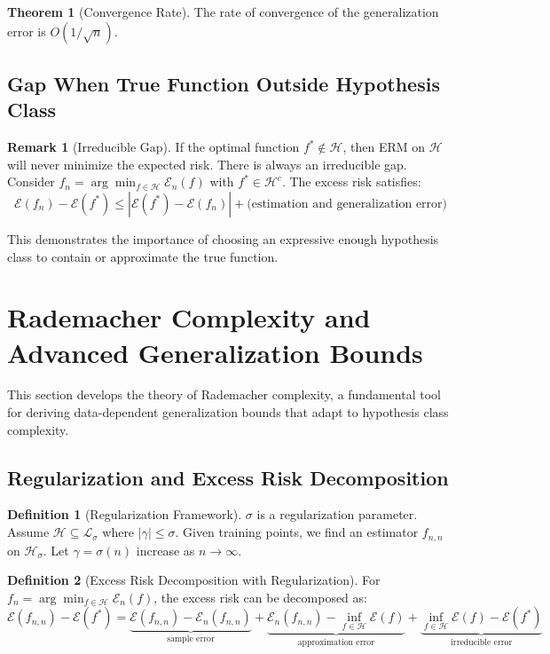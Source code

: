 \documentclass[12pt,a4paper]{article}
\theoremstyle{definition}
\newtheorem{definition}{Definition}[section]
\newtheorem{theorem}{Theorem}[section]
\newtheorem{remark}{Remark}[section]
\begin{document}
\begin{theorem}[Convergence Rate]
The rate of convergence of the generalization error is $O(1/\sqrt{n})$.
\end{theorem}

\subsection{Gap When True Function Outside Hypothesis Class}

\begin{remark}[Irreducible Gap]
If the optimal function $f^* \notin \mathcal{H}$, then ERM on $\mathcal{H}$ will never minimize the expected risk. There is always an irreducible gap. Consider $f_n = \arg\min_{f \in \mathcal{H}} \mathcal{E}_n(f)$ with $f^* \in \mathcal{H}^c$. The excess risk satisfies:
\[
\mathcal{E}(f_n) - \mathcal{E}(f^*) \leq |\mathcal{E}(f^*) - \mathcal{E}(f_n)| + \text{(estimation and generalization error)}
\]

This demonstrates the importance of choosing an expressive enough hypothesis class to contain or approximate the true function.
\end{remark}

\newpage


\section{Rademacher Complexity and Advanced Generalization Bounds}

This section develops the theory of Rademacher complexity, a fundamental tool for deriving data-dependent generalization bounds that adapt to hypothesis class complexity.

\subsection{Regularization and Excess Risk Decomposition}

\begin{definition}[Regularization Framework]
$\sigma$ is a regularization parameter. Assume $\mathcal{H} \subseteq \mathcal{L}_\sigma$ where $|\gamma| \leq \sigma$. Given training points, we find an estimator $f_{n,n}$ on $\mathcal{H}_\sigma$. Let $\gamma = \sigma(n)$ increase as $n \to \infty$.
\end{definition}

\begin{definition}[Excess Risk Decomposition with Regularization]
For $f_n = \arg\min_{f \in \mathcal{H}} \mathcal{E}_n(f)$, the excess risk can be decomposed as:
\[
\mathcal{E}(f_{n,n}) - \mathcal{E}(f^*) = \underbrace{\mathcal{E}(f_{n,n}) - \mathcal{E}_n(f_{n,n})}_{\text{sample error}} + \underbrace{\mathcal{E}_n(f_{n,n}) - \inf_{f \in \mathcal{H}} \mathcal{E}(f)}_{\text{approximation error}} + \underbrace{\inf_{f \in \mathcal{H}} \mathcal{E}(f) - \mathcal{E}(f^*)}_{\text{irreducible error}}
\]
\end{definition}
\end{document}

